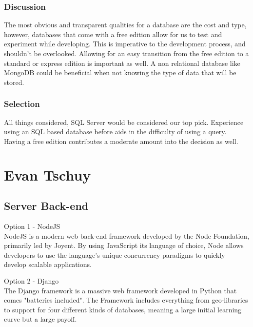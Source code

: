 \documentclass[onecolumn, draftclsnofoot,10pt, compsoc]{IEEEtran}
\begin{document}
{\medskip

\subsubsection{Discussion}
\noindent The most obvious and transparent qualities for a database are the cost and type, however, databases that come with a free edition allow for us to test and experiment while developing. This is imperative to the development process, and shouldn't be overlooked. Allowing for an easy transition from the free edition to a standard or express edition is important as well. A non relational database like MongoDB could be beneficial when not knowing the type of data that will be stored.


\subsubsection{Selection}
\noindent All things considered, SQL Server would be considered our top pick. Experience using an SQL based database before aids in the difficulty of using a query. Having a free edition contributes a moderate amount into the decision as well.








%
\newpage
\section{Evan Tschuy}

\subsection{Server Back-end}
\noindent Option 1 - NodeJS \\
\noindent NodeJS is a modern web back-end framework developed by the Node Foundation,
primarily led by Joyent. By using JavaScript its language of choice, Node allows
developers to use the language's unique concurrency paradigms to quickly develop
scalable applications.

\medskip

\noindent Option 2 - Django \\
\noindent The Django framework is a massive web framework developed in Python that comes "batteries
included". The Framework includes everything from geo-libraries to support for four different kinds of
databases, meaning a large initial learning curve but a large payoff.

}
\end{document}
